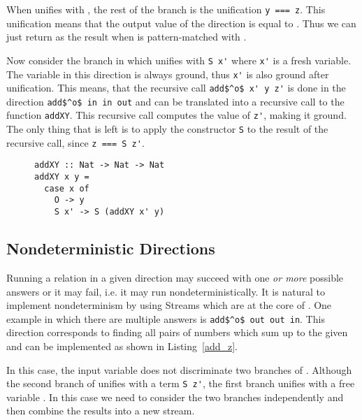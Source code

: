 When \x unifies with \zero, the rest of the \conde branch is the unification \lstinline{y === z}.
This unification means that the output value of the direction is equal to \y.
Thus we can just return \y as the result when \x is pattern-matched with \zero.

Now consider the \conde branch in which \x unifies with \lstinline{S x'} where \lstinline{x'} is a fresh variable.
The variable \x in this direction is always ground, thus \lstinline{x'} is also ground after unification.
This means, that the recursive call \lstinline{add$^o$ x' y z'} is done in the direction \lstinline{add$^o$ in in out} and can be translated into a recursive call to the function \lstinline{addXY}.
This recursive call computes the value of \lstinline{z'}, making it ground.
The only thing that is left is to apply the constructor \lstinline{S} to the result of the recursive call, since \lstinline{z === S z'}.

\begin{figure}[!t]
  \centering
  \begin{minipage}{\columnwidth}
    \begin{lstlisting}[label={add_x_y}, caption={Function for \lstinline{addo in in out} direction}, captionpos=b, frame=tb]
addXY :: Nat -> Nat -> Nat
addXY x y =
  case x of
    O -> y
    S x' -> S (addXY x' y)
    \end{lstlisting}
  \end{minipage}
\end{figure}

\subsection{Nondeterministic Directions}

Running a relation in a given direction may succeed with one \emph{or more} possible answers or it may fail, i.e. it may run nondeterministically.
It is natural to implement nondeterminism by using Streams which are at the core of \mk.
One example in which there are multiple answers is \lstinline{add$^o$ out out in}.
This direction corresponds to finding all pairs of numbers which sum up to the given \z and can be implemented as shown in Listing~\ref{add_z}.

In this case, the input variable \z does not discriminate two branches of \conde.
Although the second branch of \conde unifies \z with a term \lstinline{S z'}, the first branch unifies \z with a free variable \y.
In this case we need to consider the two branches independently and then combine the results into a new stream.

